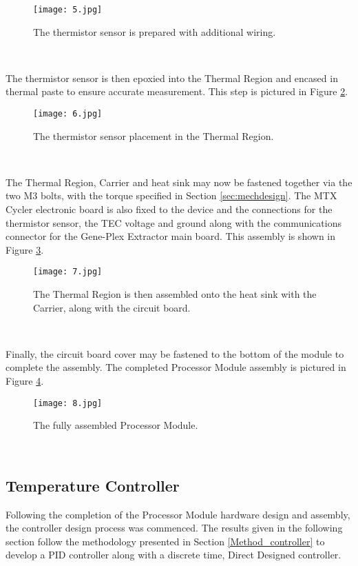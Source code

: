 \begin{figure}[!htb]
	\centering
	\texttt{[image: 5.jpg]}
	\caption[Thermistor Preparation.]{The thermistor sensor is prepared with additional wiring.}
	\label{fig:5}
\end{figure} 
\FloatBarrier

The thermistor sensor is then epoxied into the Thermal Region and encased in thermal paste to ensure accurate measurement. This step is pictured in Figure \ref{fig:6}.

\begin{figure}[!htb]
	\centering
	\texttt{[image: 6.jpg]}
	\caption[Thermistor Placement.]{The thermistor sensor placement in the Thermal Region.}
	\label{fig:6}
\end{figure} 
\FloatBarrier

The Thermal Region, Carrier and heat sink may now be fastened together via the two M3 bolts, with the torque specified in Section \ref{sec:mechdesign}. The MTX Cycler electronic board is also fixed to the device and the connections for the thermistor sensor, the TEC voltage and ground along with the communications connector for the Gene-Plex Extractor main board. This assembly is shown in Figure \ref{fig:7}. 

\begin{figure}[!htb]
	\centering
	\texttt{[image: 7.jpg]}
	\caption[Thermal Region and Board Assembly.]{The Thermal Region is then assembled onto the heat sink with the Carrier, along with the circuit board.}
	\label{fig:7}
\end{figure} 
\FloatBarrier

Finally, the circuit board cover may be fastened to the bottom of the module to complete the assembly. The completed Processor Module assembly is pictured in Figure \ref{fig:8}.

\begin{figure}[!htb]
	\centering
	\texttt{[image: 8.jpg]}
	\caption[Assembled Processor Module.]{The fully assembled Processor Module.}
	\label{fig:8}
\end{figure} 
\FloatBarrier

\subsection{Temperature Controller}
\label{sec:ControllerDesign}

Following the completion of the Processor Module hardware design and assembly, the controller design process was commenced. The results given in the following section follow the methodology presented in Section \ref{Method_controller} to develop a PID controller along with a discrete time, Direct Designed controller.

